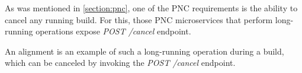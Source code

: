 \documentclass[../main.tex]{subfiles}
\begin{document}
As was mentioned in \ref{section:pnc}, one of the PNC requirements is the ability to cancel any running build. For this, those PNC microservices that perform long-running operations expose \textit{POST /cancel} endpoint.

An alignment is an example of such a long-running operation during a build, which can be canceled by invoking the \textit{POST /cancel} endpoint.
\end{document}
